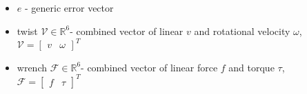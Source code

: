 \begin{itemize}
	to the pinocchio::getFrameJacobian() function,
	but this is not done in the SMC framework \textit{at all}.
\item $ e  $ - generic error vector 
\item twist $ \mathcal{V}  \in \mathbb{R}^6$- combined vector of linear $ v  $
	and rotational velocity $ \omega  $, 
	$ \mathcal{V} = \begin{bmatrix} v & \omega \end{bmatrix}^{ T }  $
\item wrench $ \mathcal{F} \in \mathbb{R}^6 $- combined vector of linear force $ f  $
	and torque $ \tau  $, 
	$ \mathcal{F} = \begin{bmatrix} f & \tau \end{bmatrix}^{ T }  $
\end{itemize}
